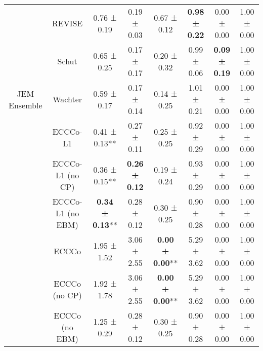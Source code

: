 \begin{table}
{\begin{tabular}[t]{cccccccc}
 & REVISE & 0.76 ± 0.19\hphantom{*}\hphantom{*} & 0.19 ± 0.03\hphantom{*}\hphantom{*} & 0.67 ± 0.12\hphantom{*}\hphantom{*} & \textbf{0.98 ± 0.22}\hphantom{*}\hphantom{*} & 0.00 ± 0.00\hphantom{*}\hphantom{*} & 1.00 ± 0.00\hphantom{*}\hphantom{*}\\

 & Schut & 0.65 ± 0.25\hphantom{*}\hphantom{*} & 0.17 ± 0.17\hphantom{*}\hphantom{*} & 0.20 ± 0.32\hphantom{*}\hphantom{*} & 0.99 ± 0.06\hphantom{*}\hphantom{*} & \textbf{0.09 ± 0.19}\hphantom{*}\hphantom{*} & 1.00 ± 0.00\hphantom{*}\hphantom{*}\\

\multirow[t]{-9}{*}{\centering\arraybackslash JEM Ensemble} & Wachter & 0.59 ± 0.17\hphantom{*}\hphantom{*} & 0.17 ± 0.14\hphantom{*}\hphantom{*} & 0.14 ± 0.25\hphantom{*}\hphantom{*} & 1.01 ± 0.21\hphantom{*}\hphantom{*} & 0.00 ± 0.00\hphantom{*}\hphantom{*} & 1.00 ± 0.00\hphantom{*}\hphantom{*}\\
\cmidrule{1-8}
 & ECCCo-L1 & 0.41 ± 0.13** & 0.27 ± 0.11\hphantom{*}\hphantom{*} & 0.25 ± 0.25\hphantom{*}\hphantom{*} & 0.92 ± 0.29\hphantom{*}\hphantom{*} & 0.00 ± 0.00\hphantom{*}\hphantom{*} & 1.00 ± 0.00\hphantom{*}\hphantom{*}\\

 & ECCCo-L1 (no CP) & 0.36 ± 0.15** & \textbf{0.26 ± 0.12}\hphantom{*}\hphantom{*} & 0.19 ± 0.24\hphantom{*}\hphantom{*} & 0.93 ± 0.29\hphantom{*}\hphantom{*} & 0.00 ± 0.00\hphantom{*}\hphantom{*} & 1.00 ± 0.00\hphantom{*}\hphantom{*}\\

 & ECCCo-L1 (no EBM) & \textbf{0.34 ± 0.13}** & 0.28 ± 0.12\hphantom{*}\hphantom{*} & 0.30 ± 0.25\hphantom{*}\hphantom{*} & 0.90 ± 0.28\hphantom{*}\hphantom{*} & 0.00 ± 0.00\hphantom{*}\hphantom{*} & 1.00 ± 0.00\hphantom{*}\hphantom{*}\\

 & ECCCo & 1.95 ± 1.52\hphantom{*}\hphantom{*} & 3.06 ± 2.55\hphantom{*}\hphantom{*} & \textbf{0.00 ± 0.00}** & 5.29 ± 3.62\hphantom{*}\hphantom{*} & 0.00 ± 0.00\hphantom{*}\hphantom{*} & 1.00 ± 0.00\hphantom{*}\hphantom{*}\\

 & ECCCo (no CP) & 1.92 ± 1.78\hphantom{*}\hphantom{*} & 3.06 ± 2.55\hphantom{*}\hphantom{*} & \textbf{0.00 ± 0.00}** & 5.29 ± 3.62\hphantom{*}\hphantom{*} & 0.00 ± 0.00\hphantom{*}\hphantom{*} & 1.00 ± 0.00\hphantom{*}\hphantom{*}\\

 & ECCCo (no EBM) & 1.25 ± 0.29\hphantom{*}\hphantom{*} & 0.28 ± 0.12\hphantom{*}\hphantom{*} & 0.30 ± 0.25\hphantom{*}\hphantom{*} & 0.90 ± 0.28\hphantom{*}\hphantom{*} & 0.00 ± 0.00\hphantom{*}\hphantom{*} & 1.00 ± 0.00\hphantom{*}\hphantom{*}\\


\end{tabular}}
\end{table}
